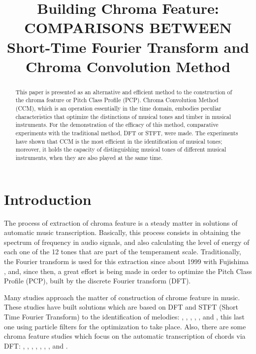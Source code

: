 \documentclass{article}
\title{Building Chroma Feature: COMPARISONS BETWEEN Short-Time Fourier Transform and Chroma Convolution Method}
\begin{document}
%
\maketitle
%
\begin{abstract}

This paper is presented as an alternative and efficient method to the construction of the chroma feature or Pitch Class Profile (PCP). Chroma Convolution Method (CCM), which is an operation essentially in the time domain, embodies peculiar characteristics that optimize the distinctions of musical tones and timber in musical instruments. For the demonstration of the efficacy of this method, comparative experiments with the traditional method, DFT or STFT,  were made. The experiments have shown that CCM is the most efficient in the identification of musical tones; moreover, it holds the capacity of distinguishing musical tones of different musical instruments, when they are also played at the same time.
\end{abstract}
%
\section{Introduction}\label{sec:introduction}


	The process of extraction of chroma feature is a steady matter in solutions of automatic music transcription. Basically, this process consists in obtaining the spectrum of frequency in audio signals, and also calculating the level of energy of each one of the 12 tones that are part of the temperament scale. Traditionally, the Fourier transform is used for this extraction since about 1999 with Fujishima \cite{fujishima1999realtime}, and, since then, a great effort is being made in order to optimize the Pitch Class Profile (PCP), built by the discrete Fourier transform (DFT).

	Many studies approach the matter of construction of chrome feature in music. These studies have built solutions which are based on DFT and STFT (Short Time Fourier Transform) to the identification of melodies: \cite{muto2002transcription}, \cite{al2008time}, \cite{barbancho2009transcription}, \cite{gomez2004automatic}, \cite{tangmelody}, \cite{eggink2004extracting} and \cite{jo2010melody}, this last one using particle filters for the optimization to  take place. Also, there are some chroma feature studies which focus on the automatic transcription of chords via DFT:
	\cite{harte2009automatic}, \cite{khadkevich2011time}, \cite{harte2010towards}, \cite{peeters2006chroma}, \cite{cho2010exploring} \cite{lee2006automatic}, \cite{de2012improving}, \cite{boulanger2013audio}, \cite{chen2012chord} and \cite{hrybyk2010combined}.
\end{document}
